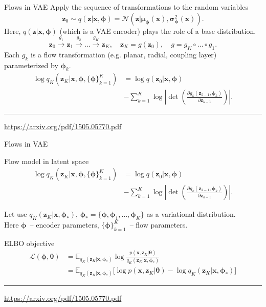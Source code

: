 \documentclass{beamer}
\newcommand{\bx}{\mathbf{x}}
\newcommand{\bz}{\mathbf{z}}
\newcommand{\bmu}{\boldsymbol{\mu}}
\newcommand{\bsigma}{\boldsymbol{\sigma}}
\newcommand{\btheta}{\boldsymbol{\theta}}
\newcommand{\bphi}{\boldsymbol{\phi}}
\begin{document}
\begin{frame}{Flows in VAE}
	Apply the sequence of transformations to the random variables 
	\[
	\bz_0 \sim q(\bz | \bx, \bphi) = \mathcal{N}(\bz| \bmu_{\bphi}(\bx), \bsigma^2_{\bphi}(\bx)).
	\]
	Here, $q(\bz | \bx, \bphi)$ (which is a VAE encoder) plays the role of a base distribution.
	\[
	\bz_0 \xrightarrow{g_1} \bz_1 \xrightarrow{g_2} \dots \xrightarrow{g_K} \bz_K, \quad \bz_K = g(\bz_0), \quad g = g_K \circ \dots \circ g_1.
	\]
	Each $g_k $ is a flow transformation (e.g. planar, radial, coupling layer) parameterized by $\bphi_k$.
	\begin{align*}
		\log q_K(\bz_K | \bx, \bphi, \{\bphi\}_{k=1}^K) &= \log q(\bz_0 | \bx, \bphi) \\ &- \sum_{k=1}^K \log \left| \det \left( \frac{\partial g_k(\bz_{k - 1}, \bphi_k)}{\partial \bz_{k-1}} \right) \right|.
	\end{align*}
	
	\vfill
	\hrule\medskip
	{\scriptsize \href{https://arxiv.org/pdf/1505.05770.pdf}{https://arxiv.org/pdf/1505.05770.pdf}} 
\end{frame}
\begin{frame}{Flows in VAE}
	\begin{block}{Flow model in latent space}
		\vspace{-0.5cm}
		\begin{align*}
			\log q_K(\bz_K | \bx, \bphi, \{\bphi\}_{k=1}^K) &= \log q(\bz_0 | \bx, \bphi) \\ &- \sum_{k=1}^K \log \left| \det \left( \frac{\partial g_k(\bz_{k - 1}, \bphi_k)}{\partial \bz_{k-1}} \right) \right|.
		\end{align*}
		\vspace{-0.5cm}
	\end{block}
	Let use $q_K(\bz_K | \bx, \bphi_*), \, \bphi_* = \{\bphi, \bphi_1, \dots, \bphi_K\}$ as a variational distribution. \\
	Here $\bphi$~-- encoder parameters, $\{\bphi\}_{k=1}^K$~-- flow parameters.
	\begin{block}{ELBO objective}
		\vspace{-0.5cm}
		\begin{align*}
			\mathcal{L} (\bphi, \btheta)  &= \mathbb{E}_{q_K(\bz_K | \bx, \bphi_*)} \log \frac{p(\bx, \bz_K | \btheta)}{q_K(\bz_K| \bx, \bphi_*)} \\
			&= \mathbb{E}_{q_K(\bz_K | \bx, \bphi_*)} \bigl[\log p(\bx, \bz_K | \btheta) - \log q_K(\bz_K| \bx, \bphi_*) \bigr] 
		\end{align*}
	\end{block}
	\vfill
	\hrule\medskip
	{\scriptsize \href{https://arxiv.org/pdf/1505.05770.pdf}{https://arxiv.org/pdf/1505.05770.pdf}} 
\end{frame}
\end{document}
